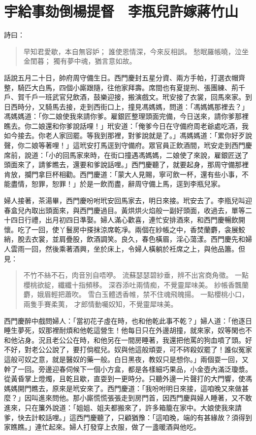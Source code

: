 
\chapter{宇給事劾倒楊提督　李瓶兒許嫁蔣竹山}

詩曰：
\begin{quote}
早知君愛歇，本自無容妒；
誰使恩情深，今來反相誤。
愁眠羅帳曉，泣坐金閨暮；
獨有夢中魂，猶言意如故。
\end{quote}

話說五月二十日，帥府周守備生日。西門慶封五星分資、兩方手帕，打選衣帽齊整，騎匹大白馬，四個小廝跟隨，往他家拜壽。席間也有夏提刑、張團練、荊千戶、賀千戶一班武官兒飲酒，鼓樂迎接，搬演戲文。玳安接了衣裳，回馬來家。到日西時分，又騎馬去接，走到西街口上，撞見馮媽媽，問道：「馮媽媽那裡去？」馮媽媽道：「你二娘使我來請你爹。雇銀匠整理頭面完備，今日送來，請你爹那裡瞧去。你二娘還和你爹說話哩！」玳安道：「俺爹今日在守備府周老爺處吃酒，我如今接去。你老人家回罷。等我到那裡，對爹說就是了。」馮媽媽道：「累你好歹說聲，你二娘等著哩！」這玳安打馬逕到守備府。眾官員正飲酒間，玳安走到西門慶席前，說道：「小的回馬家來時，在街口撞遇馮媽媽，二娘使了來說，雇銀匠送了頭面來了，請爹瞧去，還要和爹說話哩。」西門慶聽了，就要起身，那周守備那裡肯放，攔門拿巨杯相勸。西門慶道：「蒙大人見賜，寧可飲一杯，還有些小事，不能盡情，恕罪，恕罪！」於是一飲而盡，辭周守備上馬，逕到李瓶兒家。

婦人接著，茶湯畢，西門慶吩咐玳安回馬家去，明日來接。玳安去了。李瓶兒叫迎春盒兒內取出頭面來，與西門慶過目。黃烘烘火焰般一副好頭面，收過去，單等二十四日行禮，出月初四日準娶。婦人滿心歡喜，連忙安排酒來，和西門慶暢飲開懷。吃了一回，使丫鬟房中搽抹涼席乾凈。兩個在紗帳之中，香焚蘭麝，衾展鮫綃，脫去衣裳，並肩疊股，飲酒調笑。良久，春色橫眉，淫心蕩漾。西門慶先和婦人雲雨一回，然後乘著酒興，坐於床上，令婦人橫躺於衽席之上，與他品簫。但見：
\begin{quote}
不竹不絲不石，肉音別自唔咿。
流蘇瑟瑟碧紗垂，辨不出宮商角徵。
一點櫻桃欲綻，纖纖十指頻移。
深吞添吐兩情痴，不覺靈犀味美。
紗帳香飄蘭麝，娥眉輕把蕭吹。
雪白玉體透香帷，禁不住魂飛魄揚。
一點櫻桃小口，兩隻手賽柔荑，
才郎情動囑奴知，不覺靈犀味美。
\end{quote}

西門慶醉中戲問婦人：「當初花子虛在時，也和他乾此事不乾？」婦人道：「他逐日睡生夢死，奴那裡耐煩和他乾這營生！他每日只在外邊胡撞，就來家，奴等閑也不和他沾身。況且老公公在時，和他另在一間房睡著，我還把他罵的狗血噴了頭。好不好，對老公公說了，要打倘棍兒。奴與他這般頑耍，可不硶殺奴罷了！誰似冤家這般可奴之意，就是醫奴的藥一般。白日黑夜，教奴只是想你。」兩個耍一回，又幹了一回。旁邊迎春伺候下一個小方盒，都是各樣細巧果品，小金壺內滿泛瓊漿。從黃昏掌上燈燭，且乾且歇，直耍到一更時分。只聽外邊一片聲打的大門響，使馮媽媽開門瞧去，原來是玳安來了。西門慶道：「我吩咐明日來接，這咱晚又來做甚麼？」因叫進來問他。那小廝慌慌張張走到房門首，因西門慶與婦人睡著，又不敢進來，只在簾外說道：「姐姐、姐夫都搬來了，許多箱籠在家中。大娘使我來請爹，快去計較話哩。」這西門慶聽了，只顧猶豫：「這咱晚，端的有甚緣故？須得到家瞧瞧。」連忙起來。婦人打發穿上衣服，做了一盞暖酒與他吃。

